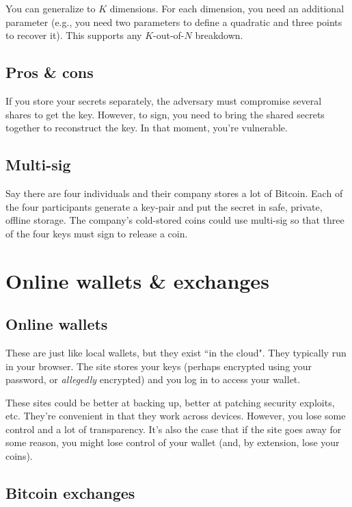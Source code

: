 \documentclass[12pt]{article}
\begin{document}
You can generalize to $K$ dimensions. For each dimension, you need an additional parameter (e.g., you need two parameters to define a quadratic and three points to recover it). This supports any $K$-out-of-$N$ breakdown.

\subsection*{Pros \& cons}

If you store your secrets separately, the adversary must compromise several shares to get the key. However, to sign, you need to bring the shared secrets together to reconstruct the key. In that moment, you're vulnerable.

\subsection*{Multi-sig}

Say there are four individuals and their company stores a lot of Bitcoin. Each of the four participants generate a key-pair and put the secret in safe, private, offline storage. The company's cold-stored coins could use multi-sig so that three of the four keys must sign to release a coin.

\section*{Online wallets \& exchanges}

\subsection*{Online wallets}

These are just like local wallets, but they exist ``in the cloud". They typically run in your browser. The site stores your keys (perhaps encrypted using your password, or \textit{allegedly} encrypted) and you log in to access your wallet.

These sites could be better at backing up, better at patching security exploits, etc. They're convenient in that they work across devices. However, you lose some control and a lot of transparency. It's also the case that if the site goes away for some reason, you might lose control of your wallet (and, by extension, lose your coins).

\subsection*{Bitcoin exchanges}
\end{document}
